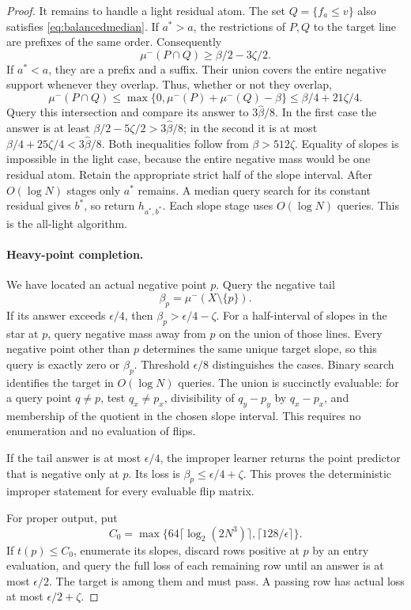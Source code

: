 \begin{proof}
It remains to handle a light residual atom. The set $Q=\{f_a\le v\}$ also satisfies \eqref{eq:balancedmedian}. If $a^*>a$, the restrictions of $P,Q$ to the target line are prefixes of the same order. Consequently
\[
 \mu^-(P\cap Q)\ge\beta/2-3\zeta/2.
\]
If $a^*<a$, they are a prefix and a suffix. Their union covers the entire negative support whenever they overlap. Thus, whether or not they overlap,
\[
 \mu^-(P\cap Q)
 \le\max\{0,\mu^-(P)+\mu^-(Q)-\beta\}
 \le\beta/4+21\zeta/4.
\]
Query this intersection and compare its answer to $3\widehat\beta/8$. In the first case the answer is at least $\beta/2-5\zeta/2>3\widehat\beta/8$; in the second it is at most $\beta/4+25\zeta/4<3\widehat\beta/8$. Both inequalities follow from $\beta>512\zeta$. Equality of slopes is impossible in the light case, because the entire negative mass would be one residual atom. Retain the appropriate strict half of the slope interval. After $O(\log N)$ stages only $a^*$ remains. A median query search for its constant residual gives $b^*$, so return $h_{a^*,b^*}$. Each slope stage uses $O(\log N)$ queries. This is the all-light algorithm.

\paragraph{Heavy-point completion.}
We have located an actual negative point $p$. Query the negative tail
\[
 \beta_p=\mu^-(X\setminus\{p\}).
\]
If its answer exceeds $\epsilon/4$, then $\beta_p>\epsilon/4-\zeta$. For a half-interval of slopes in the star at $p$, query negative mass away from $p$ on the union of those lines. Every negative point other than $p$ determines the same unique target slope, so this query is exactly zero or $\beta_p$. Threshold $\epsilon/8$ distinguishes the cases. Binary search identifies the target in $O(\log N)$ queries. The union is succinctly evaluable: for a query point $q\ne p$, test $q_x\ne p_x$, divisibility of $q_y-p_y$ by $q_x-p_x$, and membership of the quotient in the chosen slope interval. This requires no enumeration and no evaluation of flips.

If the tail answer is at most $\epsilon/4$, the improper learner returns the point predictor that is negative only at $p$. Its loss is $\beta_p\le\epsilon/4+\zeta$. This proves the deterministic improper statement for every evaluable flip matrix.

For proper output, put
\[
 C_0=\max\{64\lceil\log_2(2N^3)\rceil,\lceil128/\epsilon\rceil\}.
\]
If $t(p)\le C_0$, enumerate its slopes, discard rows positive at $p$ by an entry evaluation, and query the full loss of each remaining row until an answer is at most $\epsilon/2$. The target is among them and must pass. A passing row has actual loss at most $\epsilon/2+\zeta$.


\end{proof}
